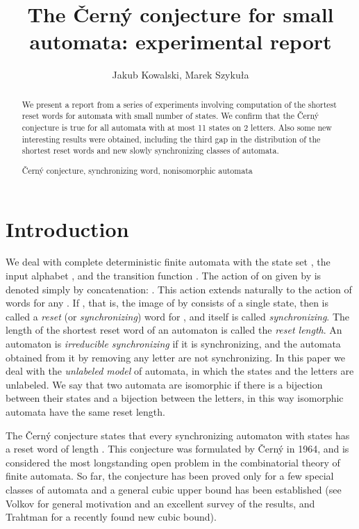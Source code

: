 \documentclass[runningheads,a4paper]{llncs}
\newcommand{\<}{\langle}
\renewcommand{\>}{\rangle}
\newcommand{\keywords}[1]{\par\addvspace\baselineskip
\noindent\keywordname\enspace\ignorespaces#1}
\begin{document}
\title{The \v{C}ern\'{y} conjecture for small automata: experimental report}
\author{Jakub Kowalski, Marek Szyku{\l}a}
\date{}
\maketitle

\begin{abstract}
We present a report from a series of experiments involving computation of the shortest reset words for automata with small number of states. We confirm that the \v{C}ern\'{y} conjecture is true for all automata with at most 11 states on 2 letters. Also some new interesting results were obtained, including the third gap in the distribution of the shortest reset words and new slowly synchronizing classes of automata.

\keywords{\v{C}ern\'{y} conjecture, synchronizing word, nonisomorphic automata}
\end{abstract}

\section{Introduction}
We deal with complete deterministic finite automata  with the state set , the input alphabet
, and the transition function . The action of  on  given by  is denoted simply by concatenation: . This action extends naturally to the action  of words for any . If , that is, the image of  by  consists of a single state, then  is called a \emph{reset} (or \emph{synchronizing}) word for , and  itself is called \emph{synchronizing}. The length of the shortest reset word of an automaton is called the \emph{reset length}. An automaton is \emph{irreducible synchronizing} if it is synchronizing, and the automata obtained from it by removing any letter are not synchronizing. In this paper we deal with the \emph{unlabeled model} of automata, in which the states and the letters are unlabeled. We say that two automata are isomorphic if there is a bijection between their states and a bijection between the letters, in this way isomorphic automata have the same reset length.

The \v{C}ern\'{y} conjecture states that every synchronizing automaton  with  states has a reset word of length . This conjecture was formulated by \v{C}ern\'{y} in 1964, and is considered the most longstanding open problem in the combinatorial theory of finite automata. So far, the conjecture has been proved only for a few special classes of automata and a general cubic upper bound has been established (see Volkov \cite{Vo2008} for general motivation and an excellent survey of the results, and Trahtman \cite{Tr2011} for a recently found new cubic bound).
\end{document}
